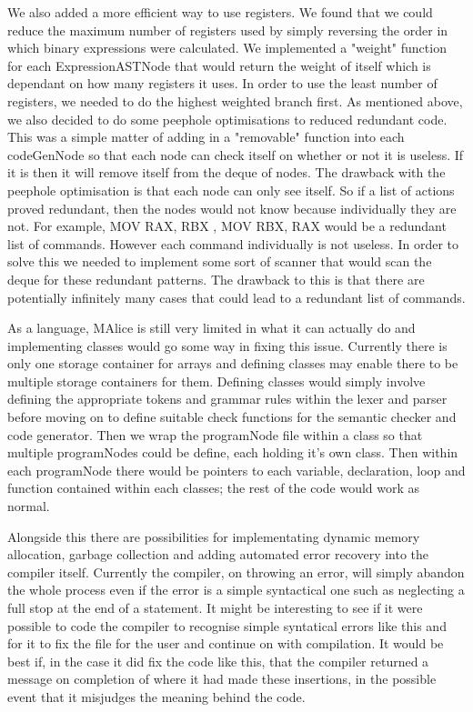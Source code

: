 \documentclass[8pt, a4paper]{article}
\begin{document}
We also added a more efficient way to use registers. We found that we could reduce the maximum number of registers used by simply reversing the order in which binary expressions were calculated. We implemented a "weight" function for each ExpressionASTNode that would return the weight of itself which is dependant on how many registers it uses. In order to use the least number of registers, we needed to do the highest weighted branch first. As mentioned above, we also decided to do some peephole optimisations to reduced redundant code. This was a simple matter of adding in a "removable" function into each codeGenNode so that each node can check itself on whether or not it is useless. If it is then it will remove itself from the deque of nodes. The drawback with the peephole optimisation is that each node can only see itself. So if a list of actions proved redundant, then the nodes would not know because individually they are not. For example, MOV RAX, RBX , MOV RBX, RAX would be a redundant list of commands. However each command individually is not useless. In order to solve this we needed to implement some sort of scanner that would scan the deque for these redundant patterns. The drawback to this is that there are potentially infinitely many cases that could lead to a redundant list of commands. 

As a language, MAlice is still very limited in what it can actually do and implementing classes would go some way in fixing this issue. Currently there is only one storage container for arrays and defining classes may enable there to be multiple storage containers for them. Defining classes would simply involve defining the appropriate tokens and grammar rules within the lexer and parser before moving on to define suitable check functions for the semantic checker and code generator. Then we wrap the programNode file within a class so that multiple programNodes could be define, each holding it's own class. Then within each programNode there would be pointers to each variable, declaration, loop and function contained within each classes; the rest of the code would work as normal.

Alongside this there are possibilities for implementating dynamic memory allocation, garbage collection and adding automated error recovery into the compiler itself. Currently the compiler, on throwing an error, will simply abandon the whole process even if the error is a simple syntactical one such as neglecting a full stop at the end of a statement. It might be interesting to see if it were possible to code the compiler to recognise simple syntatical errors like this and for it to fix the file for the user and continue on with compilation. It would be best if, in the case it did fix the code like this, that the compiler returned a message on completion of where it had made these insertions, in the possible event that it misjudges the meaning behind the code. 
\end{document}
